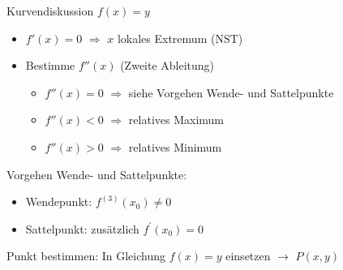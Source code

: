 \begin{corollary}{Kurvendiskussion} $f(x) = y$
    \begin{itemize}
        \item $f'(x) = 0$ $ \Rightarrow$ $x$ lokales Extremum (NST)
        \item Bestimme $f''(x)$ (Zweite Ableitung)
		\begin{itemize}
			\item $f''(x) = 0$ $ \Rightarrow$ siehe Vorgehen Wende- und Sattelpunkte
			\item $f''(x) < 0$ $ \Rightarrow$ relatives Maximum
			\item $f''(x) > 0$ $ \Rightarrow$ relatives Minimum
		\end{itemize}
    \end{itemize}
    Vorgehen Wende- und Sattelpunkte:
    \begin{itemize}
        \item Wendepunkt: $f^{(3)}(x_{0}) \neq 0$ 
        \item Sattelpunkt: zusätzlich $f^{\prime}(x_{0})=0$ 
    \end{itemize}
    Punkt bestimmen: In Gleichung $f(x) = y$ einsetzen $\rightarrow$ $P(x, y)$
\end{corollary}















































